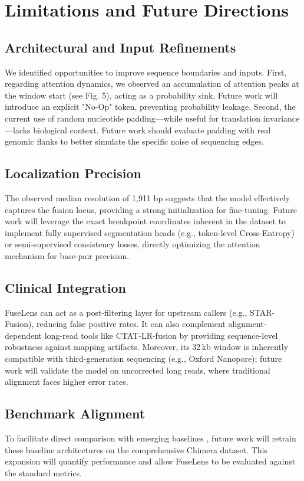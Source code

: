 \documentclass{bioinfo}
\begin{document}
\section{Limitations and Future Directions}
\label{sec:limitations_future}

\subsection{Architectural and Input Refinements}
We identified opportunities to improve sequence boundaries and inputs. First, regarding attention dynamics, we observed an accumulation of attention peaks at the window start (see Fig. 5), acting as a probability sink. Future work will introduce an explicit "No-Op" token, preventing probability leakage. Second, the current use of random nucleotide padding—while useful for translation invariance—lacks biological context. Future work should evaluate padding with real genomic flanks to better simulate the specific noise of sequencing edges.

\subsection{Localization Precision}\label{lp-future}
The observed median resolution of 1,911 bp suggests that the model effectively captures the fusion locus, providing a strong initialization for fine-tuning. Future work will leverage the exact breakpoint coordinates inherent in the dataset to implement fully supervised segmentation heads (e.g., token-level Cross-Entropy) or semi-supervised consistency losses, directly optimizing the attention mechanism for base-pair precision.

\subsection{Clinical Integration} FuseLens can act as a post-filtering layer for upstream callers (e.g., STAR-Fusion), reducing false positive rates. It can also complement alignment-dependent long-read tools like CTAT-LR-fusion \cite{ctat_lr} by providing sequence-level robustness against mapping artifacts. Moreover, its 32\,kb window is inherently compatible with third-generation sequencing (e.g., Oxford Nanopore); future work will validate the model on uncorrected long reads, where traditional alignment faces higher error rates.

\subsection{Benchmark Alignment}
To facilitate direct comparison with emerging baselines \cite{krupicka2025benchmarking}, future work will retrain these baseline architectures on the comprehensive Chimera dataset. This expansion will quantify performance and allow FuseLens to be evaluated against the standard metrics.
\end{document}
